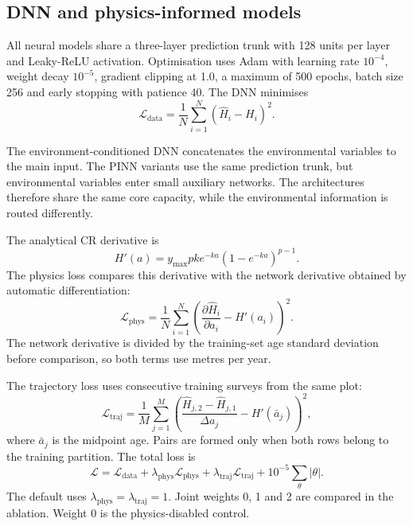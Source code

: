 \subsection{DNN and physics-informed models}
\label{sec:rq1-neural}

All neural models share a three-layer prediction trunk with 128 units per layer and Leaky-ReLU
activation. Optimisation uses Adam with learning rate $10^{-4}$, weight decay $10^{-5}$, gradient
clipping at 1.0, a maximum of 500 epochs, batch size 256 and early stopping with patience 40. The
DNN minimises
\begin{equation}
\mathcal{L}_{\mathrm{data}}=\frac{1}{N}\sum_{i=1}^{N}
\left(\hat H_i-H_i\right)^2.
\label{eq:data-loss}
\end{equation}

The environment-conditioned DNN concatenates the environmental variables to the main input. The
PINN variants use the same prediction trunk, but environmental variables enter small auxiliary
networks. The architectures therefore share the same core capacity, while the environmental
information is routed differently.

The analytical CR derivative is
\begin{equation}
H'(a)=y_{\max}pk e^{-ka}\left(1-e^{-ka}\right)^{p-1}.
\label{eq:cr-derivative}
\end{equation}
The physics loss compares this derivative with the network derivative obtained by automatic
differentiation:
\begin{equation}
\mathcal{L}_{\mathrm{phys}}=\frac{1}{N}\sum_{i=1}^{N}
\left(\frac{\partial\hat H_i}{\partial a_i}-H'(a_i)\right)^2.
\label{eq:physics-loss}
\end{equation}
The network derivative is divided by the training-set age standard deviation before comparison,
so both terms use metres per year.

The trajectory loss uses consecutive training surveys from the same plot:
\begin{equation}
\mathcal{L}_{\mathrm{traj}}=\frac{1}{M}\sum_{j=1}^{M}
\left(\frac{\hat H_{j,2}-\hat H_{j,1}}{\Delta a_j}-H'(\bar a_j)\right)^2,
\label{eq:trajectory-loss}
\end{equation}
where $\bar a_j$ is the midpoint age. Pairs are formed only when both rows belong to the training
partition. The total loss is
\begin{equation}
\mathcal{L}=\mathcal{L}_{\mathrm{data}}+
\lambda_{\mathrm{phys}}\mathcal{L}_{\mathrm{phys}}+
\lambda_{\mathrm{traj}}\mathcal{L}_{\mathrm{traj}}+
10^{-5}\sum_{\theta}|\theta|.
\label{eq:total-loss}
\end{equation}
The default uses $\lambda_{\mathrm{phys}}=\lambda_{\mathrm{traj}}=1$. Joint weights 0, 1 and 2
are compared in the ablation. Weight 0 is the physics-disabled control.

